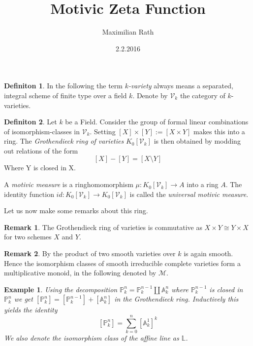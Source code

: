 \documentclass[a4paper]{article}
\author{Maximilian Rath}
\date{2.2.2016}
\title{Motivic Zeta Function}
\theoremstyle{plain}
\newtheorem{example}{Example}
\theoremstyle{definition}
\newtheorem{definition}{Definiton}
\newtheorem{remark}{Remark}
\newcommand{\gring}[1][k]{K_0[\mathcal{V}_#1]}
\begin{document}
\maketitle

\begin{definition}
    In the following the term \emph{$k$-variety} always means a separated, integral scheme of finite type over a field $k$.
    Denote by $\mathcal{V}_k$ the category of $k$-varieties.
\end{definition}

\begin{definition}
    Let $k$ be a Field. Consider the group of formal linear combinations of isomorphism-classes in $\mathcal{V}_k$.
    Setting $[X] \times [Y] := [X \times Y]$ makes this into a ring.
    The \emph{Grothendieck ring of varieties} $\gring$ is then obtained by modding out relations of the form
    \[
        [X] - [Y] = [X \setminus Y]
    \]
    Where Y is closed in X.

    A \emph{motivic measure} is a ringhomomorphism $\mu: \gring \to A$ into a ring $A$. The identity function
    $id: \gring \to \gring$ is called the \emph{universal motivic measure}.
\end{definition}

Let us now make some remarks about this ring.
\begin{remark}
    The Grothendieck ring of varieties is commutative as $X \times Y \cong Y \times X$ for two schemes $X$ and $Y$.
\end{remark}
\begin{remark}
    By \cite[Proposition 10.1 (d)]{Ha} the product of two smooth varieties over $k$ is again smooth. Hence the isomorphism classes of smooth
    irreducible complete varieties form a multiplicative monoid, in the following denoted by $\mathcal{M}$.
\end{remark}

\begin{example}
    Using the decomposition $\mathbb{P}_k^n = \mathbb{P}_k^{n-1} \coprod \mathbb{A}_k^n$ where $\mathbb{P}_k^{n-1}$ is closed in $\mathbb{P}_k^n$  
    we get $[\mathbb{P}_k^n] = [\mathbb{P}_k^{n-1}] + [\mathbb{A}_k^n]$ in the Grothendieck ring.
    Inductively this yields the identity 
    \[
        [\mathbb{P}_k^n] = \sum_{k=0}^n [\mathbb{A}_k^1]^k
    \]
    We also denote the isomorphism class of the affine line as $\mathbb{L}$.
\end{example}
\end{document}
